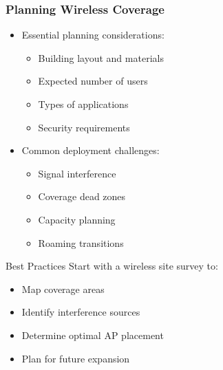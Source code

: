 \documentclass{beamer}
\begin{document}
\begin{frame}
    \frametitle{Planning Wireless Coverage}
    
    \begin{itemize}
        \item Essential planning considerations:
        \begin{itemize}
            \item Building layout and materials
            \item Expected number of users
            \item Types of applications
            \item Security requirements
        \end{itemize}
        
        \item Common deployment challenges:
        \begin{itemize}
            \item Signal interference
            \item Coverage dead zones
            \item Capacity planning
            \item Roaming transitions
        \end{itemize}
    \end{itemize}
    
    \begin{block}{Best Practices}
        Start with a wireless site survey to:
        \begin{itemize}
            \item Map coverage areas
            \item Identify interference sources
            \item Determine optimal AP placement
            \item Plan for future expansion
        \end{itemize}
    \end{block}
\end{frame}
\end{document}

